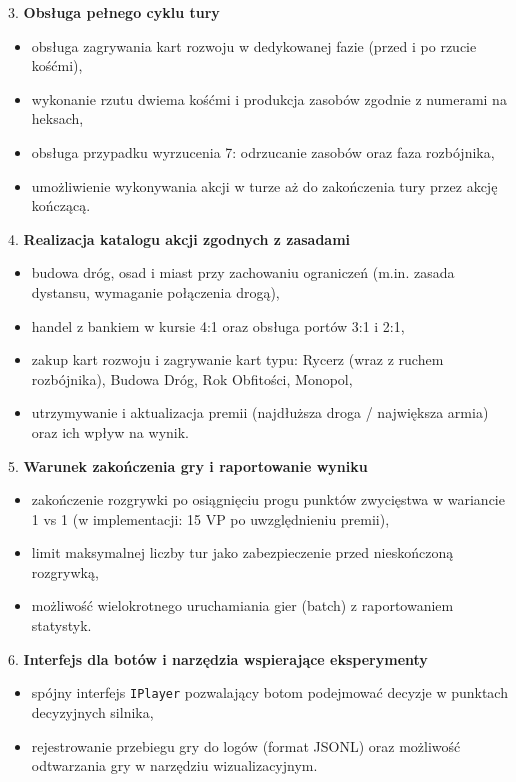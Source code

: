 \documentclass[polish,inz,longabstract]{iithesis}
\begin{document}
3. \textbf{Obsługa pełnego cyklu tury}
\begin{itemize}
\item obsługa zagrywania kart rozwoju w dedykowanej fazie (przed i po rzucie kośćmi),
\item wykonanie rzutu dwiema kośćmi i produkcja zasobów zgodnie z numerami na heksach,
\item obsługa przypadku wyrzucenia 7: odrzucanie zasobów oraz faza rozbójnika,
\item umożliwienie wykonywania akcji w turze aż do zakończenia tury przez akcję kończącą.
\end{itemize}

4. \textbf{Realizacja katalogu akcji zgodnych z zasadami}
\begin{itemize}
\item budowa dróg, osad i miast przy zachowaniu ograniczeń (m.in. zasada dystansu, wymaganie połączenia drogą),
\item handel z bankiem w kursie 4:1 oraz obsługa portów 3:1 i 2:1,
\item zakup kart rozwoju i zagrywanie kart typu: Rycerz (wraz z ruchem rozbójnika), Budowa Dróg, Rok Obfitości, Monopol,
\item utrzymywanie i aktualizacja premii (najdłuższa droga / największa armia) oraz ich wpływ na wynik.
\end{itemize}

5. \textbf{Warunek zakończenia gry i raportowanie wyniku}
\begin{itemize}
\item zakończenie rozgrywki po osiągnięciu progu punktów zwycięstwa w wariancie 1 vs 1 (w implementacji: 15 VP po uwzględnieniu premii),
\item limit maksymalnej liczby tur jako zabezpieczenie przed nieskończoną rozgrywką,
\item możliwość wielokrotnego uruchamiania gier (batch) z raportowaniem statystyk.
\end{itemize}

6. \textbf{Interfejs dla botów i narzędzia wspierające eksperymenty}
\begin{itemize}
\item spójny interfejs \texttt{IPlayer} pozwalający botom podejmować decyzje w punktach decyzyjnych silnika,
\item rejestrowanie przebiegu gry do logów (format JSONL) oraz możliwość odtwarzania gry w narzędziu wizualizacyjnym.
\end{itemize}
\end{document}
